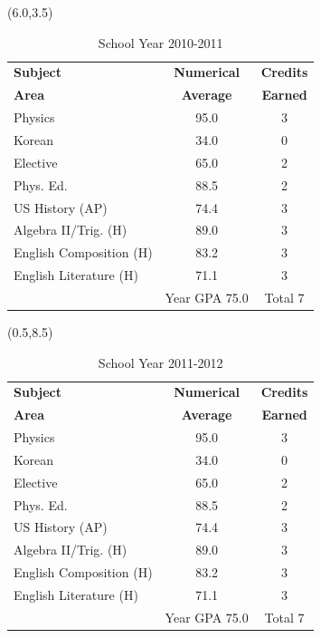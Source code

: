\documentclass [] {report}
\begin{document}
\begin{textblock}{5}(6.0,3.5)
\begin{table}
\caption{School Year 2010-2011}
\centering
\begin{tabularx}{\textwidth}{ X c c }
\toprule
{\bf Subject} & \multicolumn{1}{c}{\bf Numerical} & {\bf Credits} \\
{\bf Area}& \multicolumn{1}{c}{\bf Average} & {\bf Earned} \\
\midrule
Physics & 95.0 & 3 \\
Korean & 34.0 &  0 \\
Elective\footnotemark[2] & 65.0 & 2 \\
Phys. Ed. & 88.5 & 2 \\
US History (AP) & 74.4 & 3 \\
Algebra II/Trig. (H) & 89.0 & 3\\
English Composition (H) & 83.2 & 3 \\
English Literature (H) & 71.1 & 3 \\
\midrule
 & Year GPA 75.0 &  Total 7 \\
\bottomrule
\end{tabularx}
\end{table}
\end{textblock}

\begin{textblock}{5}(0.5,8.5)
\begin{table}
\caption{School Year 2011-2012}
\centering
\begin{tabularx}{\textwidth}{ X c c }
\toprule
{\bf Subject} & \multicolumn{1}{c}{\bf Numerical} & {\bf Credits} \\
{\bf Area}& \multicolumn{1}{c}{\bf Average} & {\bf Earned} \\
\midrule
Physics & 95.0 & 3 \\
Korean & 34.0 &  0 \\
Elective\footnotemark[2] & 65.0 & 2 \\
Phys. Ed. & 88.5 & 2 \\
US History (AP) & 74.4 & 3 \\
Algebra II/Trig. (H) & 89.0 & 3\\
English Composition (H) & 83.2 & 3 \\
English Literature (H) & 71.1 & 3 \\
\midrule
 & Year GPA 75.0 &  Total 7 \\
\bottomrule
\end{tabularx}
\end{table}
\end{textblock}
\end{document}
